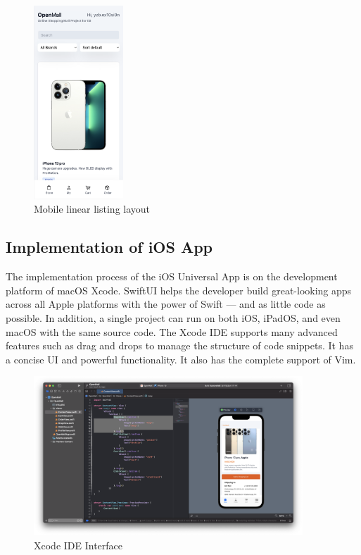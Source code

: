 \documentclass{article}
\begin{document}
\begin{figure}[!htp]
    \centering
    \includegraphics[width=0.3\textwidth]{mobileLayout.png}
    \caption{\label{fig:mobileLayout}Mobile linear listing layout}
\end{figure}


\subsection{Implementation of iOS App}

The implementation process of the iOS Universal App is on the development platform of macOS Xcode. SwiftUI helps the developer build great-looking apps across all Apple platforms with the power of Swift — and as little code as possible. In addition, a single project can run on both iOS, iPadOS, and even macOS with the same source code. The Xcode IDE supports many advanced features such as drag and drops to manage the structure of code snippets. It has a concise UI and powerful functionality. It also has the complete support of Vim.

\begin{figure}[!htp]
    \centering
    \includegraphics[width=0.9\textwidth]{xcode.png}
    \caption{\label{fig:Xcode}Xcode IDE Interface}
\end{figure}
\end{document}
